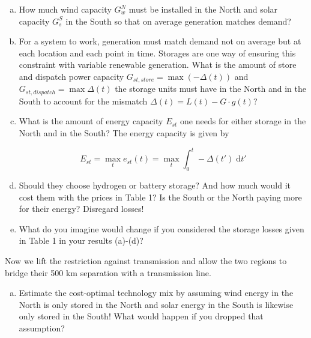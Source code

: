 \documentclass[11pt,a4paper,fleqn]{scrartcl}
\begin{document}
\begin{enumerate}[(a)]
 \item How much wind capacity $G^{N}_{w}$ must be installed in the North and solar capacity $G_s^S$ in the South so that on average generation matches demand?

 \item For a system to work, generation must match demand not on average but at each location and each point in time. Storages are one way of ensuring this constraint with variable renewable generation. What is the amount of store and dispatch power capacity $G_{st,store}=\max(-\Delta(t))$ and $G_{st,dispatch} = \max \Delta(t)$ the storage units must have in the North and in the South to account for the mismatch $\Delta(t)=L(t)-G\cdot g(t)$?
\newpage
 \item What is the amount of energy capacity $E_{st}$ one needs for either storage in the North and in the South? The energy capacity is given by

       \begin{equation*}
        E_{st} = \max_t e_{st}(t) = \max_t \int_{0}^{t} -\Delta(t') \;\mathrm{d}t'
       \end{equation*}

 \item Should they choose hydrogen or battery storage? And how much would it cost them with the prices in Table 1? Is the South or the North paying more for their energy? Disregard losses!

 \item What do you imagine would change if you considered the storage losses given in Table 1 in your results (a)-(d)?

\end{enumerate}
Now we lift the restriction against transmission and allow the two regions to bridge their 500 km separation with a transmission line.

\begin{enumerate}[(f)]
 \item  Estimate the cost-optimal technology mix by assuming wind energy in the North is only stored in the North and solar energy in the South is likewise only stored in the South! What would happen if you dropped that assumption?
\end{enumerate}
\end{document}
